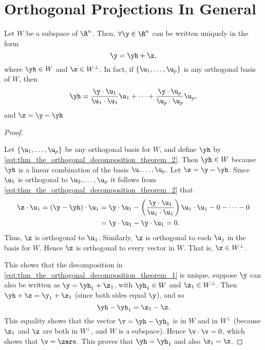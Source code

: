 
\section{Orthogonal Projections In General}
\label{sec:orthogonal_projections_in_general}

\begin{theorem}
  \label{thm:the_orthogonal_decomposition_theorem}

  Let $W$ be a subspace of $\R^n$. Then, $\forall \y \in \R^n$ can be written
  uniquely in the form
  \begin{equation}\label{eqt:thm_the_orthogonal_decomposition_theorem_1}
    \y = \yh + \z
  ,\end{equation}
  where $\yh \in W$ and $\z \in W^{\perp}$. In fact, if $\left\{\u_1, \dots,
  \u_p\right\}$ is any orthogonal basis of $W$, then
  \begin{equation}\label{eqt:thm_the_orthogonal_decomposition_theorem_2}
    \yh = \frac{\y \cdot \u_1}{\u_1 \cdot \u_1} \u_1 + \cdots + \frac{\y \cdot \u_p}{\u_p \cdot \u_p} \u_p
  ,\end{equation}
  and $\z = \y - \yh$
\end{theorem}

\begin{proof}
  \label{prf:the_orthogonal_decomposition_theorem}

  Let $\left\{\u_1, \dots, \u_p\right\}$ be any orthogonal basis for $W$, and
  define $\yh$ by \cref{eqt:thm_the_orthogonal_decomposition_theorem_2}. Then
  $\yh \in W$ because $\yh$ is a linear combination of the basis $\u, \dots,
  \u_p$. Let $\z = \y - \yh$. Since $\u_1$ is orthogonal to $\u_2, \dots, \u_p$
  it follows from \cref{eqt:thm_the_orthogonal_decomposition_theorem_2} that
  \begin{align*}
    \z \cdot \u_1 = (\y - \yh) \cdot \u_1 &= \y \cdot \u_1 - \left(\frac{\y \cdot \u_1}{\u_1 \cdot \u_1}\right) \u_1 \cdot \u_1 - 0 - \cdots - 0 \\
                                          &= \y \cdot \u_1 - \y \cdot \u_1 = 0
  .\end{align*}
  Thus, $\z$ is orthogonal to $\u_1$. Similarly, $\z$ is orthogonal to each
  $\u_j$ in the basis for $W$. Hence $\z$ is orthogonal to every vector in $W$.
  That is, $\z \in W^{\perp}$.

  This shows that the decomposition in
  \cref{eqt:thm_the_orthogonal_decomposition_theorem_1} is unique, suppose $\y$
  can also be written as $\y = \yh_1 + \z_1$, with $\yh_1 \in W$ and $\z_1 \in
  W^{\perp}$. Then $\yh + \z = \y_1 + \z_1$ (since both sides equal $\y$), and
  so
  \[%
    \yh - \yh_1 = \z_1 - \z
  .\]%
  This equality shows that the vector $\v = \yh - \yh_1$ is in $W$ and in
  $W^{\perp}$ (because $\z_1$ and $\z$ are both in $W^{\perp}$, and $W$ is a
  subspace). Hence $\v \cdot \v = 0$, which shows that $\v = \zero$. This proves
  that $\yh = \yh_1$ and also $\z_1 = \z$.
\end{proof}

